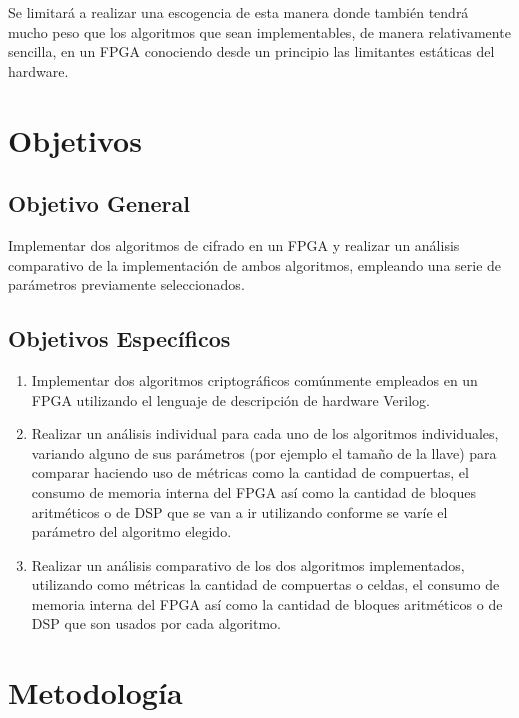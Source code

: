 Se limitará a realizar una escogencia de esta manera donde también tendrá mucho peso que los algoritmos que sean implementables, de manera relativamente sencilla, en un FPGA conociendo desde un principio las limitantes estáticas del hardware.

\section{Objetivos}

\subsection{Objetivo General}

Implementar dos algoritmos de cifrado en un FPGA y realizar un análisis comparativo de la implementación de ambos algoritmos, empleando una serie de parámetros previamente seleccionados.


\subsection{Objetivos Específicos}

\begin{enumerate}

\item Implementar dos algoritmos criptográficos comúnmente empleados en un FPGA utilizando el lenguaje de descripción de hardware Verilog.

\item Realizar un análisis individual para cada uno de los algoritmos individuales, variando alguno de sus parámetros (por ejemplo el tamaño de la llave) para comparar haciendo uso de métricas como la cantidad de compuertas, el consumo de memoria interna del FPGA así como la cantidad de bloques aritméticos o de DSP que se van a ir utilizando conforme se varíe el parámetro del algoritmo elegido.

\item Realizar un análisis comparativo de los dos algoritmos implementados, utilizando como métricas la cantidad de compuertas o celdas, el consumo de memoria interna del FPGA así como la cantidad de bloques aritméticos o de DSP que son usados por cada algoritmo.


\end{enumerate}

\section{Metodología}

